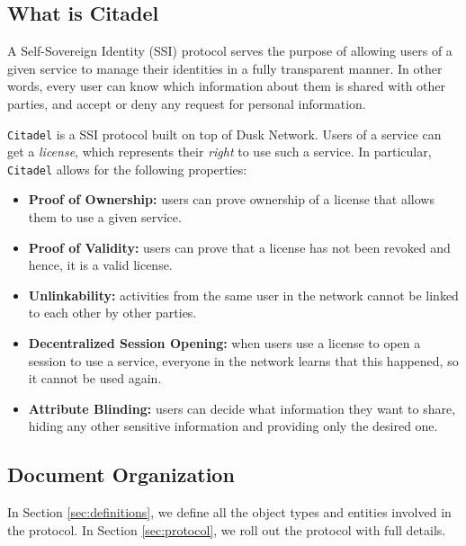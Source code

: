 
\subsection{What is Citadel} 

A Self-Sovereign Identity (SSI) protocol serves the purpose of allowing users of a given service to manage their identities in a fully transparent manner. In other words, every user can know which information about them is shared with other parties, and accept or deny any request for personal information.

\verb!Citadel! is a SSI protocol built on top of Dusk Network. Users of a service can get a \textit{license}, which represents their \textit{right} to use such a service. In particular, \verb!Citadel! allows for the following properties:

\begin{itemize}
	\item \textbf{Proof of Ownership:} users can prove ownership of a license that allows them to use a given service.
	\item \textbf{Proof of Validity:} users can prove that a license has not been revoked and hence, it is a valid license.
 	\item \textbf{Unlinkability:} activities from the same user in the network cannot be linked to each other by other parties.
 	\item \textbf{Decentralized Session Opening:} when users use a license to open a session to use a service, everyone in the network learns that this happened, so it cannot be used again.
	\item \textbf{Attribute Blinding:} users can decide what information they want to share, hiding any other sensitive information and providing only the desired one.
\end{itemize}

\subsection{Document Organization} 

In Section \ref{sec:definitions}, we define all the object types and entities involved in the protocol. In Section \ref{sec:protocol}, we roll out the protocol with full details.